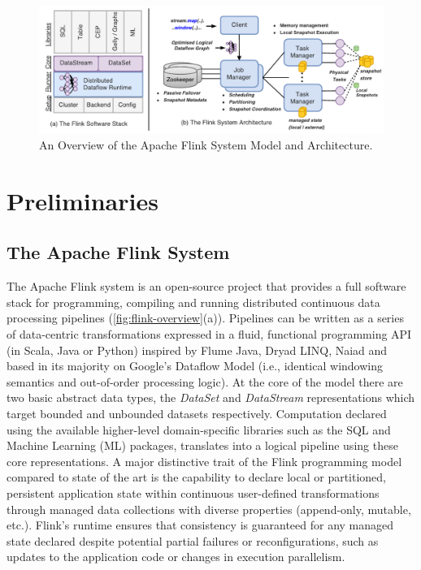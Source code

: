 \begin{figure}[t!]
\centering
\includegraphics[width=\textwidth]{figures/flinkoverview.pdf}
\caption{An Overview of the Apache Flink System Model and Architecture.} 
\label{fig:flink-overview}
\vspace{-4mm}
\end{figure}

\vspace{-2mm}

\vspace{-2mm}
\section{Preliminaries}
\label{sec:preliminaries}
\vspace{-1mm}

\subsection{The Apache Flink System}
The Apache Flink system \cite{CUSTOM:web/Flink} is an open-source project that provides a full software stack for programming, compiling and running distributed continuous data processing pipelines (\autoref{fig:flink-overview}(a)). Pipelines can be written as a series of data-centric transformations expressed in a fluid, functional programming API (in Scala, Java or Python) inspired by Flume Java\cite{chambers2010flumejava}, Dryad LINQ\cite{yu2008dryadlinq}, Naiad\cite{murray2013naiad} and based in its majority on Google's Dataflow Model \cite{akidau2015dataflow} (i.e., identical windowing semantics and out-of-order processing logic). At the core of the model there are two basic abstract data types, the \emph{DataSet} and \emph{DataStream} representations which target bounded and unbounded datasets respectively. Computation declared using the available higher-level domain-specific libraries such as the SQL and Machine Learning (ML) packages, translates into a logical pipeline using these core representations. A major distinctive trait of the Flink programming model compared to state of the art is the capability to declare local or partitioned, persistent application state within continuous user-defined transformations through managed data collections with diverse properties (append-only, mutable, etc.). Flink's runtime ensures that consistency is guaranteed for any managed state declared despite potential partial failures or reconfigurations, such as updates to the application code or changes in execution parallelism.

